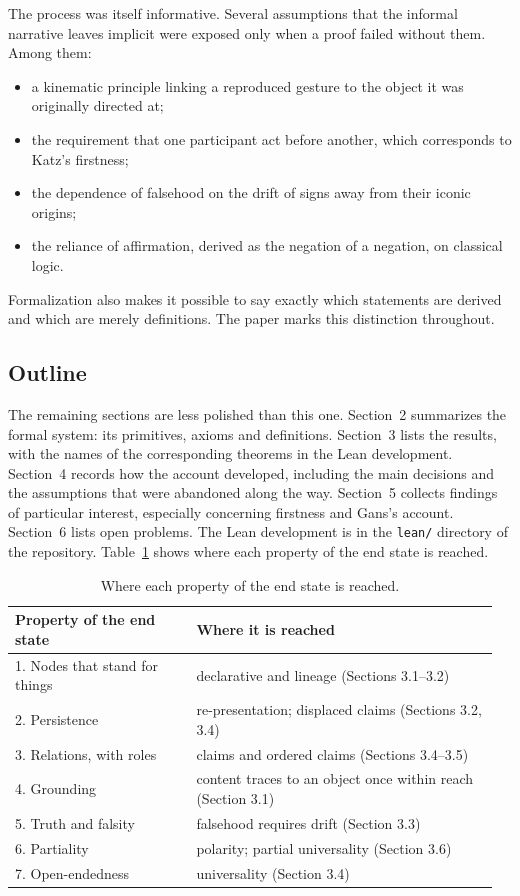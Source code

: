 \documentclass[11pt]{article}
\begin{document}
The process was itself informative. Several assumptions that the informal narrative
leaves implicit were exposed only when a proof failed without them. Among them:
\begin{itemize}[nosep]
  \item a kinematic principle linking a reproduced gesture to the object it was
    originally directed at;
  \item the requirement that one participant act before another, which corresponds to
    Katz's firstness;
  \item the dependence of falsehood on the drift of signs away from their iconic
    origins;
  \item the reliance of affirmation, derived as the negation of a negation, on classical
    logic.
\end{itemize}
Formalization also makes it possible to say exactly which statements are derived and
which are merely definitions. The paper marks this distinction throughout.

\subsection{Outline}

The remaining sections are less polished than this one. Section~2 summarizes the formal
system: its primitives, axioms and definitions. Section~3 lists the results, with the names
of the corresponding theorems in the Lean development. Section~4 records how the account
developed, including the main decisions and the assumptions that were abandoned along the
way. Section~5 collects findings of particular interest, especially concerning firstness
and Gans's account. Section~6 lists open problems. The Lean development is in the
\texttt{lean/} directory of the repository. Table~\ref{tab:roadmap} shows where each
property of the end state is reached.

\begin{table}[h]
\centering
\small
\begin{tabular}{@{}p{0.36\linewidth}p{0.6\linewidth}@{}}
\toprule
Property of the end state & Where it is reached \\
\midrule
1. Nodes that stand for things & declarative and lineage (Sections 3.1--3.2) \\
2. Persistence & re-presentation; displaced claims (Sections 3.2, 3.4) \\
3. Relations, with roles & claims and ordered claims (Sections 3.4--3.5) \\
4. Grounding & content traces to an object once within reach (Section 3.1) \\
5. Truth and falsity & falsehood requires drift (Section 3.3) \\
6. Partiality & polarity; partial universality (Section 3.6) \\
7. Open-endedness & universality (Section 3.4) \\
\bottomrule
\end{tabular}
\caption{Where each property of the end state is reached.}
\label{tab:roadmap}
\end{table}
\end{document}
